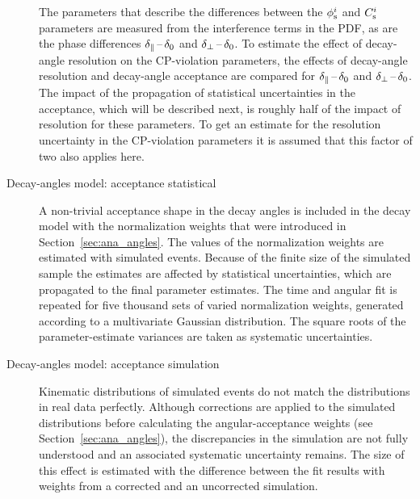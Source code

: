 \begin{description}
The parameters that describe the differences between the $\phi_\text{s}^{i}$ and $C_\text{s}^{i}$ parameters are measured from the interference terms in the
PDF, as are the phase differences $\delta_{\parallel}\,\text{--}\,\delta_{0}$ and $\delta_{\perp}\,\text{--}\,\delta_{0}$. To estimate the effect of decay-angle resolution on the CP-violation
parameters, the effects of decay-angle resolution and decay-angle acceptance are compared for $\delta_{\parallel}\,\text{--}\,\delta_{0}$ and $\delta_{\perp}\,\text{--}\,\delta_{0}$. The impact
of the propagation of statistical uncertainties in the acceptance, which will be described next, is roughly half of the impact of
resolution for these parameters. To get an estimate for the resolution uncertainty in the CP-violation parameters it is assumed that this
factor of two also applies here.

\item[Decay-angles model: acceptance statistical]
A non-trivial acceptance shape in the decay angles is included in the decay model with the normalization weights that were introduced in
Section~\ref{sec:ana_angles}. The values of the normalization weights are estimated with simulated events. Because of the finite size of
the simulated sample the estimates are affected by statistical uncertainties, which are propagated to the final parameter estimates. The
time and angular fit is repeated for five thousand sets of varied normalization weights, generated according to a multivariate Gaussian
distribution. The square roots of the parameter-estimate variances are taken as systematic uncertainties.

\item[Decay-angles model: acceptance simulation]
Kinematic distributions of simulated events do not match the distributions in real data perfectly. Although corrections are applied to the
simulated distributions before calculating the angular-acceptance weights (see Section~\ref{sec:ana_angles}), the discrepancies in the
simulation are not fully understood and an associated systematic uncertainty remains. The size of this effect is estimated with the
difference between the fit results with weights from a corrected and an uncorrected simulation.
\end{description}
